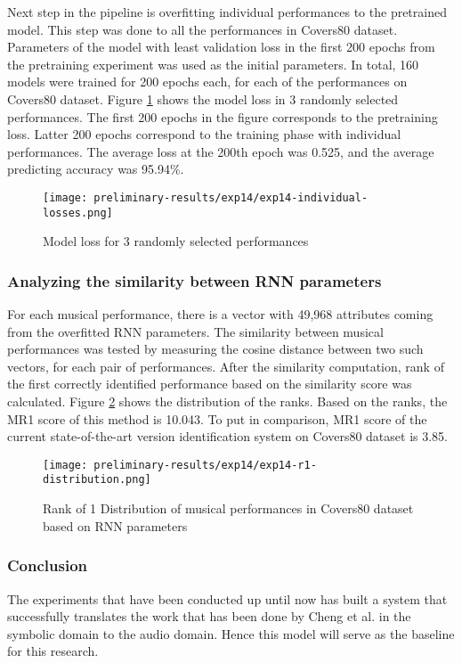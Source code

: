 \documentclass[../main.tex]{subfiles}
\begin{document}
\par
Next step in the pipeline is overfitting individual performances to the pretrained model. This step was done to all the performances in Covers80 dataset. Parameters of the model with least validation loss in the first 200 epochs from the pretraining experiment was used as the initial parameters. In total, 160 models were trained for 200 epochs each, for each of the performances on Covers80 dataset. Figure \ref{fig:exp14-performance} shows the model loss in 3 randomly selected performances. The first 200 epochs in the figure corresponds to the pretraining loss. Latter 200 epochs correspond to the training phase with individual performances. The average loss at the 200th epoch was 0.525, and the average predicting accuracy was 95.94\%.


\begin{figure}[H]
    \centering
    \texttt{[image: preliminary-results/exp14/exp14-individual-losses.png]}
    \caption{Model loss for 3 randomly selected performances}
    \label{fig:exp14-performance}
\end{figure}


\subsubsection{Analyzing the similarity between RNN parameters}

\par
For each musical performance, there is a vector with 49,968 attributes coming from the overfitted \gls{RNN} parameters. The similarity between musical performances was tested by measuring the cosine distance between two such vectors, for each pair of performances. After the similarity computation, rank of the first correctly identified performance based on the similarity score was calculated. Figure \ref{fig:exp14-r1-distribution} shows the distribution of the ranks. Based on the ranks, the \gls{MR1} score of this method is 10.043. To put in comparison, \gls{MR1} score of the current state-of-the-art version identification system \cite{jiang_yang_chen_2020} on Covers80 dataset is 3.85.

\begin{figure}[H]
    \centering
    \texttt{[image: preliminary-results/exp14/exp14-r1-distribution.png]}
    \caption{Rank of 1 Distribution of musical performances in Covers80 dataset based on RNN parameters}
    \label{fig:exp14-r1-distribution}
\end{figure}

\subsubsection{Conclusion}

\par
The experiments that have been conducted up until now has built a system that successfully translates the work that has been done by Cheng et al. in the symbolic domain \cite{tian_cheng_comparing_2018} to the audio domain. Hence this model will serve as the baseline for this research.
\end{document}
